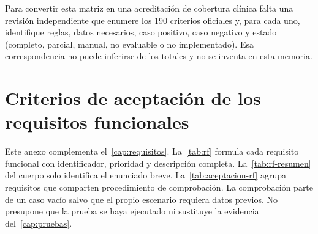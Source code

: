 Para convertir esta matriz en una acreditación de cobertura clínica falta
una revisión independiente que enumere los 190 criterios oficiales y, para
cada uno, identifique reglas, datos necesarios, caso positivo, caso
negativo y estado (completo, parcial, manual, no evaluable o no
implementado). Esa correspondencia no puede inferirse de los totales y no
se inventa en esta memoria.

\chapter{Criterios de aceptación de los requisitos funcionales}
\label{anexo:aceptacion}

Este anexo complementa el~\cref{cap:requisitos}. La~\cref{tab:rf} formula
cada requisito funcional con identificador, prioridad y descripción
completa. La~\cref{tab:rf-resumen} del cuerpo solo identifica el enunciado
breve. La~\cref{tab:aceptacion-rf} agrupa requisitos que comparten
procedimiento de comprobación. La comprobación parte de un caso vacío salvo
que el propio escenario requiera datos previos. No presupone que la prueba
se haya ejecutado ni sustituye la evidencia del~\cref{cap:pruebas}.

